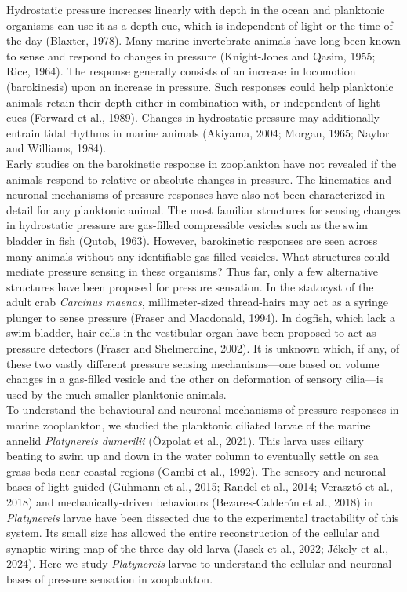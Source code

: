 \documentclass[
  11pt,
]{article}
\begin{document}
Hydrostatic pressure increases linearly with depth in the ocean and
planktonic organisms can use it as a depth cue, which is independent of
light or the time of the day (Blaxter, 1978). Many marine invertebrate
animals have long been known to sense and respond to changes in pressure
(Knight-Jones and Qasim, 1955; Rice, 1964). The response generally
consists of an increase in locomotion (barokinesis) upon an increase in
pressure. Such responses could help planktonic animals retain their
depth either in combination with, or independent of light cues (Forward
et al., 1989). Changes in hydrostatic pressure may additionally entrain
tidal rhythms in marine animals (Akiyama, 2004; Morgan, 1965; Naylor and
Williams, 1984).\\
Early studies on the barokinetic response in zooplankton have not
revealed if the animals respond to relative or absolute changes in
pressure. The kinematics and neuronal mechanisms of pressure responses
have also not been characterized in detail for any planktonic animal.
The most familiar structures for sensing changes in hydrostatic pressure
are gas-filled compressible vesicles such as the swim bladder in fish
(Qutob, 1963). However, barokinetic responses are seen across many
animals without any identifiable gas-filled vesicles. What structures
could mediate pressure sensing in these organisms? Thus far, only a few
alternative structures have been proposed for pressure sensation. In the
statocyst of the adult crab \emph{Carcinus maenas}, millimeter-sized
thread-hairs may act as a syringe plunger to sense pressure (Fraser and
Macdonald, 1994). In dogfish, which lack a swim bladder, hair cells in
the vestibular organ have been proposed to act as pressure detectors
(Fraser and Shelmerdine, 2002). It is unknown which, if any, of these
two vastly different pressure sensing mechanisms---one based on volume
changes in a gas-filled vesicle and the other on deformation of sensory
cilia---is used by the much smaller planktonic animals.\\
To understand the behavioural and neuronal mechanisms of pressure
responses in marine zooplankton, we studied the planktonic ciliated
larvae of the marine annelid \emph{Platynereis dumerilii} (Özpolat et
al., 2021). This larva uses ciliary beating to swim up and down in the
water column to eventually settle on sea grass beds near coastal regions
(Gambi et al., 1992). The sensory and neuronal bases of light-guided
(Gühmann et al., 2015; Randel et al., 2014; Verasztó et al., 2018) and
mechanically-driven behaviours (Bezares-Calderón et al., 2018) in
\emph{Platynereis} larvae have been dissected due to the experimental
tractability of this system. Its small size has allowed the entire
reconstruction of the cellular and synaptic wiring map of the
three-day-old larva (Jasek et al., 2022; Jékely et al., 2024). Here we
study \emph{Platynereis} larvae to understand the cellular and neuronal
bases of pressure sensation in zooplankton.
\end{document}
